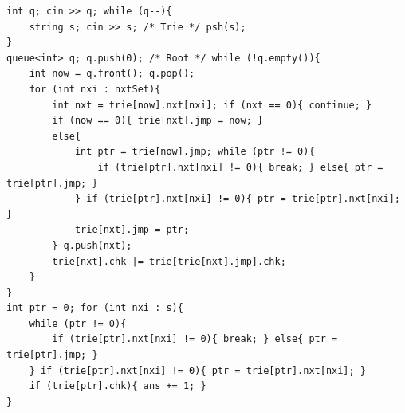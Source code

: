 \begin{verbatim}
int q; cin >> q; while (q--){
	string s; cin >> s; /* Trie */ psh(s);
}
queue<int> q; q.push(0); /* Root */ while (!q.empty()){
	int now = q.front(); q.pop();
	for (int nxi : nxtSet){
		int nxt = trie[now].nxt[nxi]; if (nxt == 0){ continue; }
		if (now == 0){ trie[nxt].jmp = now; }
		else{
			int ptr = trie[now].jmp; while (ptr != 0){
				if (trie[ptr].nxt[nxi] != 0){ break; } else{ ptr = trie[ptr].jmp; }
			} if (trie[ptr].nxt[nxi] != 0){ ptr = trie[ptr].nxt[nxi]; }
			trie[nxt].jmp = ptr;
		} q.push(nxt);
		trie[nxt].chk |= trie[trie[nxt].jmp].chk;
	}
}
int ptr = 0; for (int nxi : s){
	while (ptr != 0){
		if (trie[ptr].nxt[nxi] != 0){ break; } else{ ptr = trie[ptr].jmp; }
	} if (trie[ptr].nxt[nxi] != 0){ ptr = trie[ptr].nxt[nxi]; }
	if (trie[ptr].chk){ ans += 1; }
}
\end{verbatim}
